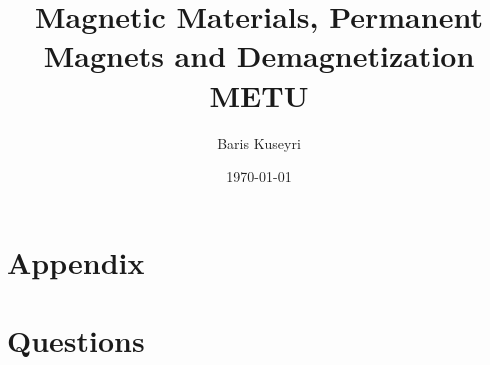 \documentclass[10pt,twoside]{article}
\begin{document}
\title{
	{Magnetic Materials, Permanent Magnets and Demagnetization} \\
	{\large METU} \\
	}
\author{Baris Kuseyri}
\date{\today}
\maketitle

\tableofcontents
\newpage





\appendix
\section{Appendix}


\section{Questions}



\newpage
\printbibliography
\end{document}
